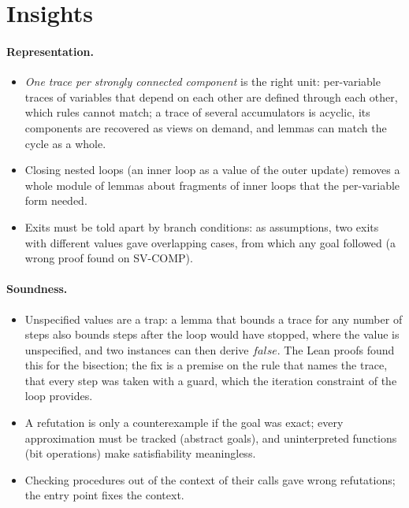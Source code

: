 \documentclass[a4paper,11pt]{article}
\begin{document}
\section{Insights}
\label{sec:insights}

\paragraph{Representation.}
\begin{itemize}
\item \emph{One trace per strongly connected component} is the right unit: per-variable traces of variables that
  depend on each other are defined through each other, which rules cannot match; a trace of several accumulators is
  acyclic, its components are recovered as views on demand, and lemmas can match the cycle as a whole.
\item Closing nested loops (an inner loop as a value of the outer update) removes a whole module of lemmas about
  fragments of inner loops that the per-variable form needed.
\item Exits must be told apart by branch conditions: as assumptions, two exits with different values gave
  overlapping cases, from which any goal followed (a wrong proof found on SV-COMP).
\end{itemize}

\paragraph{Soundness.}
\begin{itemize}
\item Unspecified values are a trap: a lemma that bounds a trace for any number of steps also bounds steps after
  the loop would have stopped, where the value is unspecified, and two instances can then derive
  $\mathit{false}$. The Lean proofs found this for the bisection; the fix is a premise on the rule that names the
  trace, that every step was taken with a guard, which the iteration constraint of the loop provides.
\item A refutation is only a counterexample if the goal was exact; every approximation must be tracked (abstract
  goals), and uninterpreted functions (bit operations) make satisfiability meaningless.
\item Checking procedures out of the context of their calls gave wrong refutations; the entry point fixes the
  context.
\end{itemize}
\end{document}
